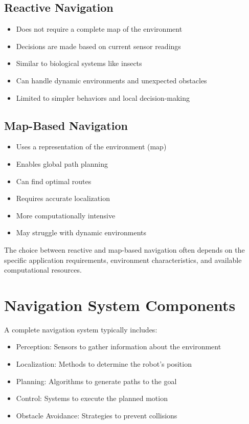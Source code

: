 \documentclass[openany]{book}
\theoremstyle{definition}
\theoremstyle{remark}
\newcommand{\note}[1]{
\begin{tcolorbox}[colback=green!5,colframe=green!40!black,title=Note]
 #1
\end{tcolorbox}
}
\begin{document}
\subsection{Reactive Navigation}
\begin{itemize}
    \item Does not require a complete map of the environment
    \item Decisions are made based on current sensor readings
    \item Similar to biological systems like insects
    \item Can handle dynamic environments and unexpected obstacles
    \item Limited to simpler behaviors and local decision-making
\end{itemize}

\subsection{Map-Based Navigation}
\begin{itemize}
    \item Uses a representation of the environment (map)
    \item Enables global path planning
    \item Can find optimal routes
    \item Requires accurate localization
    \item More computationally intensive
    \item May struggle with dynamic environments
\end{itemize}

\note{The choice between reactive and map-based navigation often depends on the specific application requirements, environment characteristics, and available computational resources.}

\section{Navigation System Components}
A complete navigation system typically includes:
\begin{itemize}
    \item Perception: Sensors to gather information about the environment
    \item Localization: Methods to determine the robot's position
    \item Planning: Algorithms to generate paths to the goal
    \item Control: Systems to execute the planned motion
    \item Obstacle Avoidance: Strategies to prevent collisions
\end{itemize}
\end{document}
